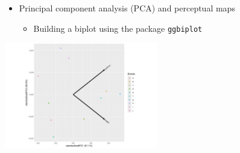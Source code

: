 \documentclass[
  ignorenonframetext,
]{beamer}
\newenvironment{Shaded}{\begin{snugshade}}{\end{snugshade}}
\newcommand{\AttributeTok}[1]{\textcolor[rgb]{0.40,0.45,0.13}{#1}}
\newcommand{\ConstantTok}[1]{\textcolor[rgb]{0.56,0.35,0.01}{#1}}
\newcommand{\DecValTok}[1]{\textcolor[rgb]{0.68,0.00,0.00}{#1}}
\newcommand{\FunctionTok}[1]{\textcolor[rgb]{0.28,0.35,0.67}{#1}}
\newcommand{\NormalTok}[1]{\textcolor[rgb]{0.00,0.23,0.31}{#1}}
\newcommand{\SpecialCharTok}[1]{\textcolor[rgb]{0.37,0.37,0.37}{#1}}
\newcommand{\StringTok}[1]{\textcolor[rgb]{0.13,0.47,0.30}{#1}}
\providecommand{\tightlist}{%
  \setlength{\itemsep}{0pt}\setlength{\parskip}{0pt}}\usepackage{longtable,booktabs,array}
\begin{document}
\begin{frame}[fragile]{}
\label{section-42}
\begin{itemize}
\item
  Principal component analysis (PCA) and perceptual maps

  \begin{itemize}
  \tightlist
  \item
    Building a biplot using the package \texttt{ggbiplot}
  \end{itemize}
\end{itemize}

\tiny

\begin{Shaded}
\end{Shaded}

\begin{center}
\includegraphics[width=0.5\textwidth,height=\textheight]{008_reducing_data_complexity_files/figure-beamer/unnamed-chunk-39-1.pdf}
\end{center}
\end{frame}
\end{document}
